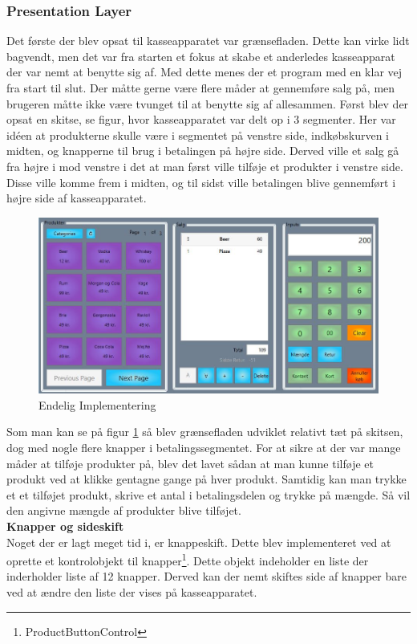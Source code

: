 \subsubsection{Presentation Layer}

Det første der blev opsat til kasseapparatet var grænsefladen. Dette kan virke lidt bagvendt, men det var fra starten et fokus at skabe et anderledes kasseapparat der var nemt at benytte sig af. Med dette menes der et program med en klar vej fra start til slut. Der måtte gerne være flere måder at gennemføre salg på, men brugeren måtte ikke være tvunget til at benytte sig af allesammen.
Først blev der opsat en skitse, se figur, hvor kasseapparatet var delt op i 3 segmenter. Her var idéen at produkterne skulle være i segmentet på venstre side, indkøbskurven i midten, og knapperne til brug i betalingen på højre side. Derved ville et salg gå fra højre i mod venstre i det at man først ville tilføje et produkter i venstre side. Disse ville komme frem i midten, og til sidst ville betalingen blive gennemført i højre side af kasseapparatet. 

\begin{figure}[H]
	\centering
	\includegraphics[width=0.9\linewidth]{Projektbeskrivelse/DesignOgImplementering/pics/GUI}
	\caption{Endelig Implementering}
	\label{fig:sub2}
\end{figure}

Som man kan se på figur \ref*{fig:sub2} så blev grænsefladen udviklet relativt tæt på skitsen, dog med nogle flere knapper i betalingssegmentet. For at sikre at der var mange måder at tilføje produkter på, blev det lavet sådan at man kunne tilføje et produkt ved at klikke gentagne gange på hver produkt. Samtidig kan man trykke et et tilføjet produkt, skrive et antal i betalingsdelen og trykke på mængde. Så vil den angivne mængde af produkter blive tilføjet. \\

\textbf{Knapper og sideskift} \\
Noget der er lagt meget tid i, er knappeskift. Dette blev implementeret ved at oprette et kontrolobjekt til knapper\footnote{ProductButtonControl}. Dette objekt indeholder en liste der inderholder liste af 12 knapper. Derved kan der nemt skiftes side af knapper bare ved at ændre den liste der vises på kasseapparatet.